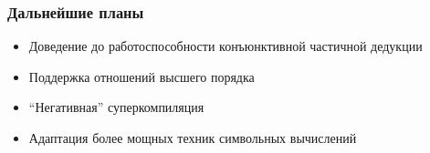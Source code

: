 \documentclass{beamer}
\begin{document}
\begin{frame}[fragile]
  \transwipe[direction=90]
  \frametitle{Дальнейшие планы}
\begin{itemize}
  \item Доведение до работоспособности конъюнктивной частичной дедукции
  \item Поддержка отношений высшего порядка
  \item ``Негативная'' суперкомпиляция
  \item Адаптация более мощных техник символьных вычислений
\end{itemize}
\end{frame}
\end{document}
